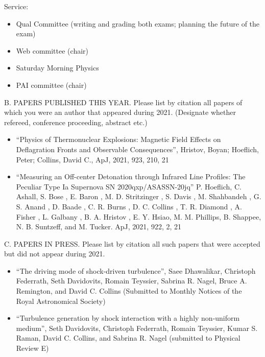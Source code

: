 \noindent
Service:
\begin{itemize}
	\item Qual Committee (writing and grading both exams; planning the future of
        the exam)
	\item Web committee (chair)
	\item Saturday Morning Physics
    \item PAI committee (chair)
\end{itemize}	
\vskip 30pt



\noindent B. PAPERS PUBLISHED THIS YEAR. Please list by citation all
papers of which you were an author that appeared during 2021.
(Designate whether refereed, conference proceeding, abstract etc.)
\bigskip

\begin{itemize}
    \item ``Physics of Thermonuclear Explosions: Magnetic Field Effects on
        Deflagration
        Fronts and Observable Consequences'', Hristov, Boyan; Hoeflich, Peter;
        Collins,
        David C., ApJ, 2021, 923, 210, 21
    \item
``Measuring an Off-center Detonation through Infrared Line Profiles: The
Peculiar Type Ia Supernova SN 2020qxp/ASASSN-20jq'' P. Hoeflich, C. Ashall,
S. Bose , E. Baron , M. D. Stritzinger , S. Davis , M. Shahbandeh , G. S.
Anand ,
D. Baade , C. R. Burns , D. C. Collins , T. R. Diamond , A. Fisher , L.
Galbany , B. A. Hristov ,
E. Y. Hsiao, M. M. Phillips, B. Shappee, N. B. Suntzeff, and M.
Tucker.  ApJ, 2021, 922, 2, 21
\end{itemize}


\noindent C. PAPERS IN PRESS. Please list by citation all such
papers that were accepted but did not appear during 2021.
\bigskip

\begin{itemize}
    \item 
        ``The driving mode of shock-driven turbulence'',
        Saee Dhawalikar, Christoph Federrath, Seth Davidovits, Romain
        Teyssier, Sabrina R. Nagel, Bruce A. Remington, and David C. Collins
        (Submitted to Monthly Notices of the Royal Astronomical Society)
    \item
        ``Turbulence generation by shock interaction with a highly non-uniform
        medium'', Seth Davidovits, Christoph Federrath, Romain Teyssier,
        Kumar S. Raman, David C. Collins, and Sabrina R. Nagel  (submitted to
        Physical
        Review E)
\end{itemize}


